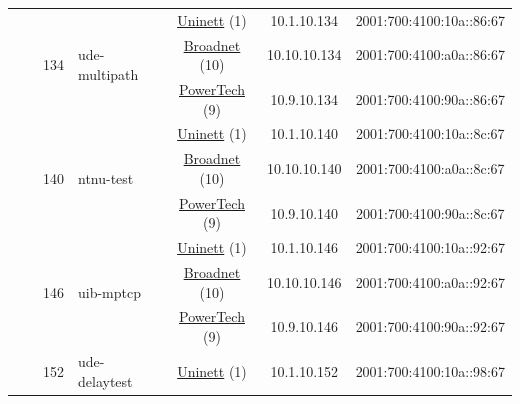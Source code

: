 \begin{small}
\begin{center}
\begin{longtable}{|c|c|c|c|c|c|c|c|}
  &  & \multirow{3}{*}{\tiny{134}} & \multicolumn{1}{|l|}{\multirow{3}{*}{\tiny{ude-multipath}}} & \multicolumn{2}{|c|}{\tiny{\href{https://www.uninett.no}{Uninett} (1)}} & \tiny{10.1.10.134} & \tiny{2001:700:4100:10a::86:67} \\* \cline{5-5}\cline{6-6}\cline{7-7}\cline{8-8}
  &  &  &  & \multicolumn{2}{|c|}{\tiny{\href{https://www.broadnet.no}{Broadnet} (10)}} & \tiny{10.10.10.134} & \tiny{2001:700:4100:a0a::86:67} \\* \cline{5-5}\cline{6-6}\cline{7-7}\cline{8-8}
  &  &  &  & \multicolumn{2}{|c|}{\tiny{\href{http://www.powertech.no}{PowerTech} (9)}} & \tiny{10.9.10.134} & \tiny{2001:700:4100:90a::86:67} \\* \cline{3-3}\cline{4-4}\cline{5-5}\cline{6-6}\cline{7-7}\cline{8-8}
  &  & \multirow{3}{*}{\tiny{140}} & \multicolumn{1}{|l|}{\multirow{3}{*}{\tiny{ntnu-test}}} & \multicolumn{2}{|c|}{\tiny{\href{https://www.uninett.no}{Uninett} (1)}} & \tiny{10.1.10.140} & \tiny{2001:700:4100:10a::8c:67} \\* \cline{5-5}\cline{6-6}\cline{7-7}\cline{8-8}
  &  &  &  & \multicolumn{2}{|c|}{\tiny{\href{https://www.broadnet.no}{Broadnet} (10)}} & \tiny{10.10.10.140} & \tiny{2001:700:4100:a0a::8c:67} \\* \cline{5-5}\cline{6-6}\cline{7-7}\cline{8-8}
  &  &  &  & \multicolumn{2}{|c|}{\tiny{\href{http://www.powertech.no}{PowerTech} (9)}} & \tiny{10.9.10.140} & \tiny{2001:700:4100:90a::8c:67} \\* \cline{3-3}\cline{4-4}\cline{5-5}\cline{6-6}\cline{7-7}\cline{8-8}
  &  & \multirow{3}{*}{\tiny{146}} & \multicolumn{1}{|l|}{\multirow{3}{*}{\tiny{uib-mptcp}}} & \multicolumn{2}{|c|}{\tiny{\href{https://www.uninett.no}{Uninett} (1)}} & \tiny{10.1.10.146} & \tiny{2001:700:4100:10a::92:67} \\* \cline{5-5}\cline{6-6}\cline{7-7}\cline{8-8}
  &  &  &  & \multicolumn{2}{|c|}{\tiny{\href{https://www.broadnet.no}{Broadnet} (10)}} & \tiny{10.10.10.146} & \tiny{2001:700:4100:a0a::92:67} \\* \cline{5-5}\cline{6-6}\cline{7-7}\cline{8-8}
  &  &  &  & \multicolumn{2}{|c|}{\tiny{\href{http://www.powertech.no}{PowerTech} (9)}} & \tiny{10.9.10.146} & \tiny{2001:700:4100:90a::92:67} \\* \cline{3-3}\cline{4-4}\cline{5-5}\cline{6-6}\cline{7-7}\cline{8-8}
  &  & \multirow{3}{*}{\tiny{152}} & \multicolumn{1}{|l|}{\multirow{3}{*}{\tiny{ude-delaytest}}} & \multicolumn{2}{|c|}{\tiny{\href{https://www.uninett.no}{Uninett} (1)}} & \tiny{10.1.10.152} & \tiny{2001:700:4100:10a::98:67} \\* \cline{5-5}\cline{6-6}\cline{7-7}\cline{8-8}

\end{longtable}
\end{center}
\end{small}

